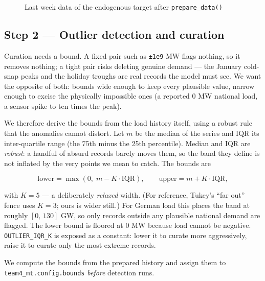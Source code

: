 \documentclass[
  english,
  letterpaper,
]{scrbook}
\begin{document}
\begin{figure}


\caption{\label{fig-team4-endogenous-last-week}Last week data of the
endogenous target after \texttt{prepare\_data()}}

\end{figure}%

\subsection{Step 2 --- Outlier detection and
curation}\label{sec-team4-outliers}

Curation needs a bound. A fixed pair such as \texttt{±1e9} MW flags
nothing, so it removes nothing; a tight pair risks deleting genuine
demand --- the January cold-snap peaks and the holiday troughs are real
records the model must see. We want the opposite of both: bounds wide
enough to keep every plausible value, narrow enough to excise the
physically impossible ones (a reported 0 MW national load, a sensor
spike to ten times the peak).

We therefore derive the bounds from the load history itself, using a
robust rule that the anomalies cannot distort. Let \(m\) be the median
of the series and \(\mathrm{IQR}\) its inter-quartile range (the 75th
minus the 25th percentile). Median and IQR are \emph{robust}: a handful
of absurd records barely moves them, so the band they define is not
inflated by the very points we mean to catch. The bounds are

\[
\text{lower} = \max(0,\; m - K\cdot\mathrm{IQR}), \qquad
\text{upper} = m + K\cdot\mathrm{IQR},
\]

with \(K = 5\) --- a deliberately \emph{relaxed} width. (For reference,
Tukey's ``far out'' fence uses \(K = 3\); ours is wider still.) For
German load this places the band at roughly \([0,\,130]\) GW, so only
records outside any plausible national demand are flagged. The lower
bound is floored at 0 MW because load cannot be negative.
\texttt{OUTLIER\_IQR\_K} is exposed as a constant: lower it to curate
more aggressively, raise it to curate only the most extreme records.

We compute the bounds from the prepared history and assign them to
\texttt{team4\_mt.config.bounds} \emph{before} detection runs.
\end{document}
